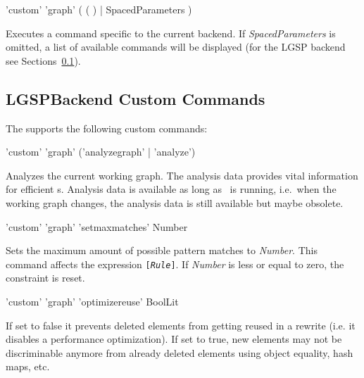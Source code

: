 \begin{rail}
  'custom' 'graph' ( ( ) | SpacedParameters )
\end{rail}
Executes a command specific to the current backend.
If \emph{SpacedParameters} is omitted, a list of available commands will be displayed (for the LGSP backend see Sections~\ref{custom}).


\subsection{LGSPBackend Custom Commands}
\label{custom}

The  supports the following custom commands:

\begin{rail}
  'custom' 'graph' ('analyzegraph' | 'analyze') 
\end{rail}
Analyzes the current working graph.
The analysis data provides vital information for efficient s.
Analysis data is available as long as \GrShell\ is running, i.e.\ when the working graph changes, the analysis data is still available but maybe obsolete.

\begin{rail}
  'custom' 'graph' 'setmaxmatches' Number
\end{rail}
Sets the maximum amount of possible pattern matches to \emph{Number}.
This command affects the expression \texttt{[\emph{Rule}]}.
If \emph{Number} is less or equal to zero, the constraint is reset.

\begin{rail}
  'custom' 'graph' 'optimizereuse' BoolLit
\end{rail}
If set to false it prevents deleted elements from getting reused in a rewrite (i.e. it disables a performance optimization).
If set to true, new elements may not be discriminable anymore from already deleted elements using object equality, hash maps, etc.
					
